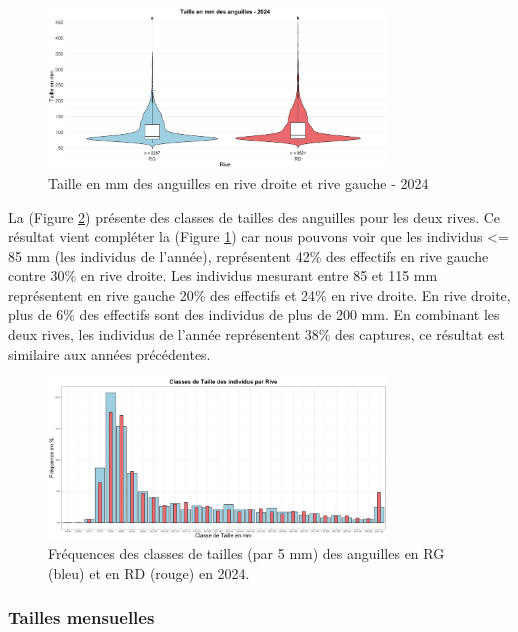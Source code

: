\documentclass[11pt,titlepage,twoside]{article}\usepackage[]{graphicx}\usepackage[table]{xcolor}
\begin{document}
\begin{figure}[htpb]
\centering
\includegraphics[width=0.8\textwidth]{taille_oral.png}
\caption{Taille en mm des anguilles en rive droite et rive gauche - 2024}
\label{taille_oral}
\end{figure}

La (Figure \ref{classe_taille_oral}) présente des classes de tailles des anguilles pour les deux rives. Ce résultat vient compléter la (Figure \ref{taille_oral}) car nous pouvons voir que les individus <= 85 mm (les individus de l’année), représentent 42\% des effectifs en rive gauche contre 30\% en rive droite. Les individus mesurant entre 85 et 115 mm représentent en rive gauche 20\% des effectifs et 24\% en rive droite. En rive droite, plus de 6\% des effectifs sont des individus de plus de 200 mm. En combinant les deux rives, les individus de l’année représentent 38\% des captures, ce résultat est similaire aux années précédentes. 


\begin{figure}[htpb]
\centering
\includegraphics[width=0.8\textwidth]{classe_taille_oral.png}
\caption{Fréquences des classes de tailles (par 5 mm) des anguilles en RG (bleu) et en RD (rouge) en 2024.}
\label{classe_taille_oral}
\end{figure}

\subsubsection{Tailles mensuelles}
\end{document}
